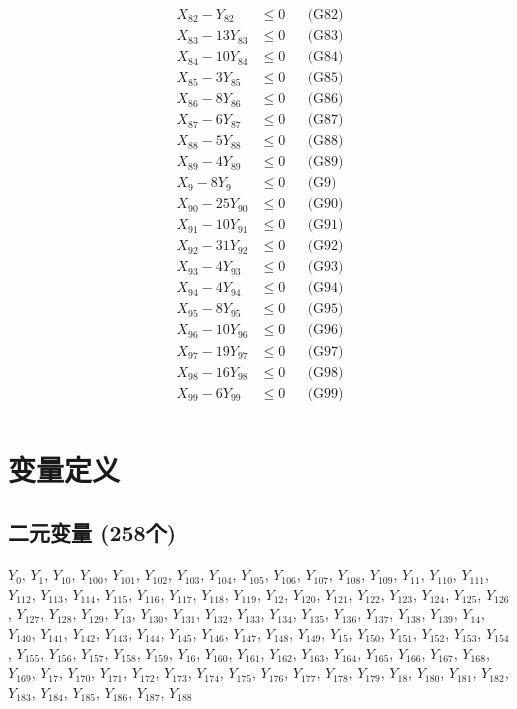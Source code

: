 \documentclass[a4paper,10pt]{article}
\begin{document}
{\begin{align}
X_{82} - Y_{82} &\leq 0 && \text{(G82)} \\
\allowbreak
X_{83} - 13Y_{83} &\leq 0 && \text{(G83)} \\
X_{84} - 10Y_{84} &\leq 0 && \text{(G84)} \\
X_{85} - 3Y_{85} &\leq 0 && \text{(G85)} \\
X_{86} - 8Y_{86} &\leq 0 && \text{(G86)} \\
X_{87} - 6Y_{87} &\leq 0 && \text{(G87)} \\
X_{88} - 5Y_{88} &\leq 0 && \text{(G88)} \\
X_{89} - 4Y_{89} &\leq 0 && \text{(G89)} \\
X_{9} - 8Y_{9} &\leq 0 && \text{(G9)} \\
X_{90} - 25Y_{90} &\leq 0 && \text{(G90)} \\
X_{91} - 10Y_{91} &\leq 0 && \text{(G91)} \\
X_{92} - 31Y_{92} &\leq 0 && \text{(G92)} \\
X_{93} - 4Y_{93} &\leq 0 && \text{(G93)} \\
X_{94} - 4Y_{94} &\leq 0 && \text{(G94)} \\
X_{95} - 8Y_{95} &\leq 0 && \text{(G95)} \\
X_{96} - 10Y_{96} &\leq 0 && \text{(G96)} \\
X_{97} - 19Y_{97} &\leq 0 && \text{(G97)} \\
X_{98} - 16Y_{98} &\leq 0 && \text{(G98)} \\
X_{99} - 6Y_{99} &\leq 0 && \text{(G99)} \\
\end{align}}

\section{变量定义}

\subsection{二元变量 (258个)}

{\small $Y_{0}$, $Y_{1}$, $Y_{10}$, $Y_{100}$, $Y_{101}$, $Y_{102}$, $Y_{103}$, $Y_{104}$, $Y_{105}$, $Y_{106}$, $Y_{107}$, $Y_{108}$, $Y_{109}$, $Y_{11}$, $Y_{110}$, $Y_{111}$, $Y_{112}$, $Y_{113}$, $Y_{114}$, $Y_{115}$, $Y_{116}$, $Y_{117}$, $Y_{118}$, $Y_{119}$, $Y_{12}$, $Y_{120}$, $Y_{121}$, $Y_{122}$, $Y_{123}$, $Y_{124}$, $Y_{125}$, $Y_{126}$, $Y_{127}$, $Y_{128}$, $Y_{129}$, $Y_{13}$, $Y_{130}$, $Y_{131}$, $Y_{132}$, $Y_{133}$, $Y_{134}$, $Y_{135}$, $Y_{136}$, $Y_{137}$, $Y_{138}$, $Y_{139}$, $Y_{14}$, $Y_{140}$, $Y_{141}$, $Y_{142}$, $Y_{143}$, $Y_{144}$, $Y_{145}$, $Y_{146}$, $Y_{147}$, $Y_{148}$, $Y_{149}$, $Y_{15}$, $Y_{150}$, $Y_{151}$, $Y_{152}$, $Y_{153}$, $Y_{154}$, $Y_{155}$, $Y_{156}$, $Y_{157}$, $Y_{158}$, $Y_{159}$, $Y_{16}$, $Y_{160}$, $Y_{161}$, $Y_{162}$, $Y_{163}$, $Y_{164}$, $Y_{165}$, $Y_{166}$, $Y_{167}$, $Y_{168}$, $Y_{169}$, $Y_{17}$, $Y_{170}$, $Y_{171}$, $Y_{172}$, $Y_{173}$, $Y_{174}$, $Y_{175}$, $Y_{176}$, $Y_{177}$, $Y_{178}$, $Y_{179}$, $Y_{18}$, $Y_{180}$, $Y_{181}$, $Y_{182}$, $Y_{183}$, $Y_{184}$, $Y_{185}$, $Y_{186}$, $Y_{187}$, $Y_{188}$}
\end{document}
